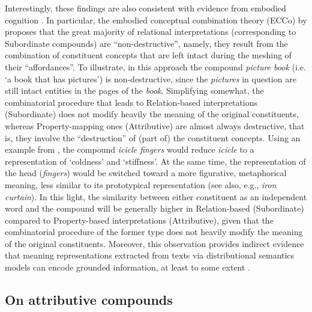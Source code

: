 \documentclass[output=paper]{langsci/langscibook}
\begin{document}
Interestingly, these findings are also consistent with evidence from embodied cognition \citep{louwerse2008}. In particular, the embodied conceptual combination theory ({ECC}o) by \cite{lynott2009} proposes that the great majority of relational interpretations (corresponding to Subordinate compounds) are ``non-destructive'', namely, they result from the combination of constituent concepts that are left intact during the meshing of their ``affordances''. To illustrate, in this approach the compound \emph{picture book} (i.e. `a book that has pictures’) is non-destructive, since the \emph{pictures} in question are still intact entities in the pages of the \emph{book}. Simplifying somewhat, the combinatorial procedure that leads to Relation-based interpretations (Subordinate) does not modify heavily the meaning of the original constituents, whereas Property-mapping ones (Attributive) are almost always destructive, that is, they involve the ``destruction'' of (part of) the constituent concepts. Using an example from \cite{lynott2009}, the compound \emph{icicle fingers} would reduce \emph{icicle} to a representation of `coldness' and `stiffness'. At the same time, the representation of the head (\emph{fingers}) would be switched toward a more figurative, metaphorical meaning, less similar to its prototypical representation (see also, e.g., \emph{iron curtain}). In this light, the similarity between either constituent as an independent word and the compound will be generally higher in Relation-based (Subordinate) compared to Property-based interpretations (Attributive), given that the combinatorial procedure of the former type does not heavily modify the meaning of the original constituents. Moreover, this observation provides indirect evidence that meaning representations extracted from texts via distributional semantics models can encode grounded information, at least to some extent \citep{louwerse2011}.

\subsection{On attributive compounds}
\end{document}

